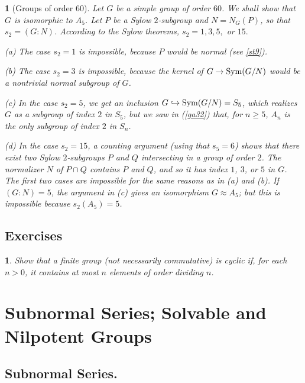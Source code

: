 \documentclass[a4paper,11pt,final]{memoir}%
\newtheorem{plain}[X]{}
\newtheorem{exercise}[Y]{}
\theoremstyle{nonumberplain}
\begin{document}
\begin{plain}
[Groups of order 60]\label{st21}%
%
Let $G$ be a simple group of order $60$. We shall show that $G$ is isomorphic
to $A_{5}$. Let $P$ be a Sylow $2$-subgroup and $N=N_{G}(P)$, so that
$s_{2}=(G:N)$. According to the Sylow theorems, $s_{2}=1,3,5,$ or $15.$

(a) The case $s_{2}=1$ is impossible, because $P$ would be normal (see
\ref{st9}).

(b) The case $s_{2}=3$ is impossible, because the kernel of $G\rightarrow
\operatorname{Sym}(G/N)$ would be a nontrivial normal subgroup of $G$.

(c) In the case $s_{2}=5$, we get an inclusion $G\hookrightarrow
\operatorname{Sym}(G/N)=S_{5}$, which realizes $G$ as a subgroup of index $2$ in $S_{5}$,
but we saw in (\ref{ga32}) that, for $n\geq5$, $A_{n}$ is the only subgroup of
index $2$ in $S_{n}$.

(d) In the case $s_{2}=15$, a counting argument (using that $s_{5}=6$) shows
that there exist two Sylow $2$-subgroups $P$ and $Q$ intersecting in a group
of order $2$. The normalizer $N$ of $P\cap Q$ contains $P$ and $Q$, and so it
has index $1$, $3$, or $5$ in $G$. The first two cases are impossible for the
same reasons as in (a) and (b). If $(G\colon N)=5$, the argument in (c) gives
an isomorphism $G\approx A_{5}$; but this is impossible because $s_{2}%
(A_{5})=5$.
\end{plain}

\section{Exercises}

\begin{exercise}
\label{x81}Show that a finite group (\textit{not} necessarily commutative) is
cyclic if, for each $n>0$, it contains at most $n$ elements of order dividing
$n$.
\end{exercise}

\clearpage


\chapter{Subnormal Series; Solvable and Nilpotent Groups}

\section{Subnormal Series.}
\end{document}
